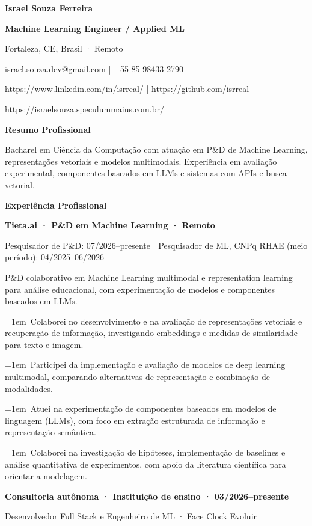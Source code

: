 \documentclass[a4paper,10pt]{article}
\begin{document}
\textbf{Israel Souza Ferreira}\par
\textbf{Machine Learning Engineer / Applied ML}\par
Fortaleza, CE, Brasil · Remoto\par
israel.souza.dev@gmail.com | +55 85 98433-2790\par
https://www.linkedin.com/in/isrreal/ | https://github.com/isrreal\par
https://israelsouza.speculummaius.com.br/\par
\vspace{5pt}\textbf{Resumo Profissional}\par
Bacharel em Ciência da Computação com atuação em P\&D de Machine Learning, representações vetoriais e modelos multimodais. Experiência em avaliação experimental, componentes baseados em LLMs e sistemas com APIs e busca vetorial.\par
\vspace{5pt}\textbf{Experiência Profissional}\par
\textbf{Tieta.ai · P\&D em Machine Learning · Remoto}\par
Pesquisador de P\&D: 07/2026–presente | Pesquisador de ML, CNPq RHAE (meio período): 04/2025–06/2026\par
P\&D colaborativo em Machine Learning multimodal e representation learning para análise educacional, com experimentação de modelos e componentes baseados em LLMs.\par
\hangindent=1em\textbullet\ Colaborei no desenvolvimento e na avaliação de representações vetoriais e recuperação de informação, investigando embeddings e medidas de similaridade para texto e imagem.\par
\hangindent=1em\textbullet\ Participei da implementação e avaliação de modelos de deep learning multimodal, comparando alternativas de representação e combinação de modalidades.\par
\hangindent=1em\textbullet\ Atuei na experimentação de componentes baseados em modelos de linguagem (LLMs), com foco em extração estruturada de informação e representação semântica.\par
\hangindent=1em\textbullet\ Colaborei na investigação de hipóteses, implementação de baselines e análise quantitativa de experimentos, com apoio da literatura científica para orientar a modelagem.\par
\textbf{Consultoria autônoma · Instituição de ensino · 03/2026–presente}\par
Desenvolvedor Full Stack e Engenheiro de ML · Face Clock Evoluir\par
\end{document}
